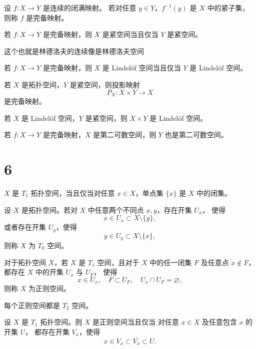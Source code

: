 \begin{definition}[定义 5.2（完备映射 $=$ 连续闭满 + 像中所有点的原像集都是紧的）]
设 $f:X\to Y$ 是连续的闭满映射。
若对任意 $y\in Y$，$f^{-1}(y)$ 是 $X$ 中的紧子集，则称 $f$ 是完备映射。
\end{definition}

\begin{theorem}
若 $f:X\to Y$ 是完备映射，则 $X$ 是紧空间当且仅当 $Y$ 是紧空间。
\end{theorem}
\begin{dxtips}
 这个也就是林德洛夫的连续像是林德洛夫空间   
\end{dxtips}

\begin{theorem}
若 $f:X\to Y$ 是完备映射，则 $X$ 是 Lindel\"of 空间当且仅当 $Y$ 是 Lindel\"of 空间。
\end{theorem}

\begin{theorem}[定理 5.14（拓扑：紧映射到自己是完备的）]
若 $X$ 是拓扑空间，$Y$ 是紧空间，则投影映射
\[
P_X:X\times Y\to X
\]
是完备映射。
\end{theorem}

\begin{corollary}[推论 5.2（Lindel\"of $\times$ 紧 $=$ Lindel\"of）]
若 $X$ 是 Lindel\"of 空间，$Y$ 是紧空间，则 $X\times Y$ 是 Lindel\"of 空间。
\end{corollary}

\begin{theorem}[定理 5.15（完备保持第二可数）]
若 $f:X\to Y$ 是完备映射，$X$ 是第二可数空间，则 $Y$ 也是第二可数空间。
\end{theorem}
\section{6}
\begin{theorem}[定理 6.2]
$X$ 是 $T_1$ 拓扑空间，当且仅当对任意 $x\in X$，单点集 $\{x\}$ 是 $X$ 中的闭集。
\end{theorem}

\begin{definition}[定义 6.4 ($T_0$ 空间)]
设 $X$ 是拓扑空间。若对 $X$ 中任意两个不同点 $x,y$，存在开集 $U_x$，
使得
\[
x\in U_x\subset X\setminus\{y\},
\]
或者存在开集 $U_y$，使得
\[
y\in U_y\subset X\setminus\{x\},
\]
则称 $X$ 为 $T_0$ 空间。
\end{definition}

\begin{definition}[定义 6.6（正则空间）]
对于拓扑空间 $X$，若 $X$ 是 $T_1$ 空间，且对于 $X$ 中的任一闭集 $F$
及任意点 $x\notin F$，都存在 $X$ 中的开集 $U_x$ 与 $U_F$，
使得
\[
x\in U_x,\quad F\subset U_F,\quad U_x\cap U_F=\varnothing,
\]
则称 $X$ 为正则空间。
\end{definition}

\begin{theorem}[定理 6.7]
每个正则空间都是 $T_2$ 空间。
\end{theorem}

\begin{theorem}[定理 6.8]
设 $X$ 是 $T_1$ 拓扑空间。则 $X$ 是正则空间当且仅当
对任意 $x\in X$ 及任意包含 $x$ 的开集 $U$，
都存在开集 $V_x$，使得
\[
x\in V_x\subset \overline{V_x}\subset U.
\]
\end{theorem}